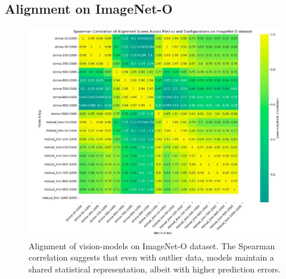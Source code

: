 \documentclass[10pt,a4paper]{article}
\begin{document}
\subsection{Alignment on ImageNet-O}
\begin{figure}[H]
    \centering
    \includegraphics[width=\textwidth]{prh_correlation_ood.jpg}
    \caption{Alignment of vision-models on ImageNet-O dataset. The Spearman correlation suggests that even with outlier data, models maintain a shared statistical representation, albeit with higher prediction errors.}
    \label{fig:prh_correlation_ood}
\end{figure}
\end{document}

